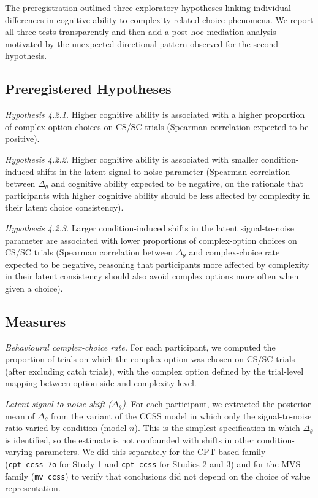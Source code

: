 \documentclass[man,floatsintext]{apa7}
\begin{document}
The preregistration outlined three exploratory hypotheses linking individual differences in cognitive ability to complexity-related choice phenomena. We report all three tests transparently and then add a post-hoc mediation analysis motivated by the unexpected directional pattern observed for the second hypothesis.

\subsection{Preregistered Hypotheses}

\noindent\textit{Hypothesis 4.2.1.} Higher cognitive ability is associated with a higher proportion of complex-option choices on CS/SC trials (Spearman correlation expected to be positive).

\noindent\textit{Hypothesis 4.2.2.} Higher cognitive ability is associated with smaller condition-induced shifts in the latent signal-to-noise parameter (Spearman correlation between $\Delta_\theta$ and cognitive ability expected to be negative, on the rationale that participants with higher cognitive ability should be less affected by complexity in their latent choice consistency).

\noindent\textit{Hypothesis 4.2.3.} Larger condition-induced shifts in the latent signal-to-noise parameter are associated with lower proportions of complex-option choices on CS/SC trials (Spearman correlation between $\Delta_\theta$ and complex-choice rate expected to be negative, reasoning that participants more affected by complexity in their latent consistency should also avoid complex options more often when given a choice).

\subsection{Measures}

\textit{Behavioural complex-choice rate.} For each participant, we computed the proportion of trials on which the complex option was chosen on CS/SC trials (after excluding catch trials), with the complex option defined by the trial-level mapping between option-side and complexity level.

\textit{Latent signal-to-noise shift ($\Delta_\theta$).} For each participant, we extracted the posterior mean of $\Delta_\theta$ from the variant of the CCSS model in which only the signal-to-noise ratio varied by condition (model $n$). This is the simplest specification in which $\Delta_\theta$ is identified, so the estimate is not confounded with shifts in other condition-varying parameters. We did this separately for the CPT-based family (\texttt{cpt\_ccss\_7o} for Study 1 and \texttt{cpt\_ccss} for Studies 2 and 3) and for the MVS family (\texttt{mv\_ccss}) to verify that conclusions did not depend on the choice of value representation.
\end{document}
